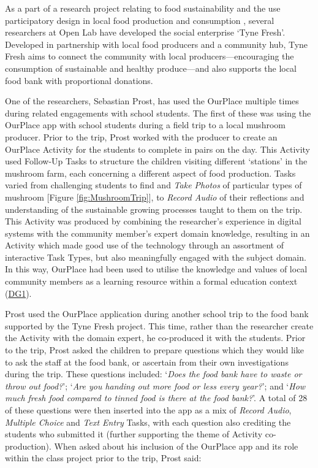 As a part of a research project relating to food sustainability and the use participatory design in local food production and consumption \citep{Prost2019}, several researchers at Open Lab have developed the social enterprise `Tyne Fresh'. Developed in partnership with local food producers and a community hub, Tyne Fresh aims to connect the community with local producers---encouraging the consumption of sustainable and healthy produce---and also supports the local food bank with proportional donations.

One of the researchers, Sebastian Prost, has used the OurPlace multiple times during related engagements with school students. The first of these was using the OurPlace app with school students during a field trip to a local mushroom producer. Prior to the trip, Prost worked with the producer to create an OurPlace Activity for the students to complete in pairs on the day. This Activity used Follow-Up Tasks to structure the children visiting different `stations' in the mushroom farm, each concerning a different aspect of food production. Tasks varied from challenging students to find and \textit{Take Photos} of particular types of mushroom [Figure \ref{fig:MushroomTrip}], to \textit{Record Audio} of their reflections and understanding of the sustainable growing processes taught to them on the trip. This Activity was produced by combining the researcher's experience in digital systems with the community member's expert domain knowledge, resulting in an Activity which made good use of the technology through an assortment of interactive Task Types, but also meaningfully engaged with the subject domain. In this way, OurPlace had been used to utilise the knowledge and values of local community members as a learning resource within a formal education context (\hyperref[DG1]{DG1}).

Prost used the OurPlace application during another school trip to the food bank supported by the Tyne Fresh project. This time, rather than the researcher create the Activity with the domain expert, he co-produced it with the students. Prior to the trip, Prost asked the children to prepare questions which they would like to ask the staff at the food bank, or ascertain from their own investigations during the trip. These questions included: `\textit{Does the food bank have to waste or throw out food?}'; `\textit{Are you handing out more food or less every year?}'; and `\textit{How much fresh food compared to tinned food is there at the food bank?}'. A total of 28 of these questions were then inserted into the app as a mix of \textit{Record Audio}, \textit{Multiple Choice} and \textit{Text Entry} Tasks, with each question also crediting the students who submitted it (further supporting the theme of Activity co-production). When asked about his inclusion of the OurPlace app and its role within the class project prior to the trip, Prost said:

